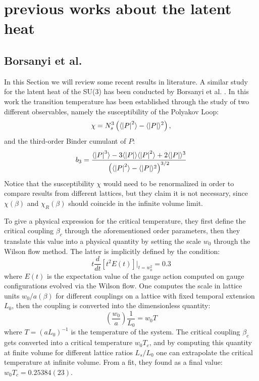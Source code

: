 \documentclass{article}
\begin{document}
\section{previous works about the latent heat}

\subsection{Borsanyi et al.}

In this Section we will review some recent results in literature. A similar study for the latent heat of the SU(3) has been conducted by Borsanyi et al. \cite{Borsanyi:2022xml}. In this work the transition temperature has been established through the study of two different observables, namely the susceptibility of the Polyakov Loop:
\begin{equation}
    \chi = N_s^3 \left(\langle \abs{P}^2 \rangle - \langle \abs{P} \rangle^2 \right),
\end{equation}
and the third-order Binder cumulant of $P$:
\begin{equation}
    b_3 = \frac{\langle \abs{P}^3 \rangle - 3 \langle \abs{P} \rangle \langle \abs{P}^2 \rangle + 2 \langle \abs{P} \rangle^3}{\left( \langle \abs{P}^2 \rangle - \langle \abs{P} \rangle^2 \right)^{3/2}}
\end{equation}
Notice that the susceptibility $\chi$ would need to be renormalized in order to compare results from different lattices, but they claim it is not necessary, since $\chi(\beta)$ and $\chi_R(\beta)$ should coincide in the infinite volume limit.

To give a physical expression for the critical temperature, they first define the critical coupling $\beta_c$ through the aforementioned order parameters, then they translate this value into a physical quantity by setting the scale $w_0$ through the Wilson flow method. The latter is implicitly defined by the condition:
\begin{equation}
    t \frac{d}{dt}\left[ t^2 E(t) \right]\rvert_{t = w_0^2
} = 0.3 
\end{equation}
where $E(t)$ is the expectation value of the gauge action computed on gauge configurations evolved via the Wilson flow.
One computes the scale in lattice units $w_0/a(\beta)$ for different couplings on a lattice with fixed temporal extension $L_0$, then the coupling is converted into the dimensionless quantity:
\begin{equation}
    \left(\frac{w_0}{a} \right) \frac{1}{L_0} = w_0 T
\end{equation}
where $T = (a L_0)^{-1}$ is the temperature of the system. The critical coupling $\beta_c$ gets converted into a critical temperature $w_0 T_c$, and by computing this quantity at finite volume for different lattice ratios $L_s/L_0$ one can extrapolate the critical temperature at infinite volume.
From a fit, they found as a final value: $w_0 T_c = 0.25384(23)$.
\end{document}
